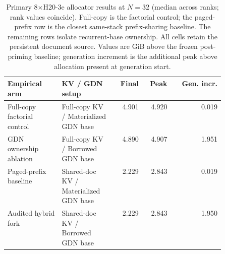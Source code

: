 \begin{table}[H]
\caption{Primary 8$\times$H20-3e allocator results at $N=32$ (median across ranks; rank values coincide). Full-copy is the factorial control; the paged-prefix row is the closest same-stack prefix-sharing baseline. The remaining rows isolate recurrent-base ownership. All cells retain the persistent document source. Values are GiB above the frozen post-priming baseline; generation increment is the additional peak above allocation present at generation start.}
\label{tab:rr2-memory}
\centering\scriptsize
\setlength{\tabcolsep}{2.6pt}
\begin{tabular}{@{}p{0.25\linewidth}p{0.25\linewidth}rrr@{}}
\toprule
Empirical arm & KV / GDN setup & Final & Peak & Gen. incr. \\
\midrule
Full-copy factorial control & Full-copy KV / Materialized GDN base & 4.901 & 4.920 & 0.019 \\
GDN ownership ablation & Full-copy KV / Borrowed GDN base & 4.890 & 4.907 & 1.951 \\
Paged-prefix baseline & Shared-doc KV / Materialized GDN base & 2.229 & 2.843 & 0.019 \\
Audited hybrid fork & Shared-doc KV / Borrowed GDN base & 2.229 & 2.843 & 1.950 \\
\bottomrule
\end{tabular}
\end{table}
